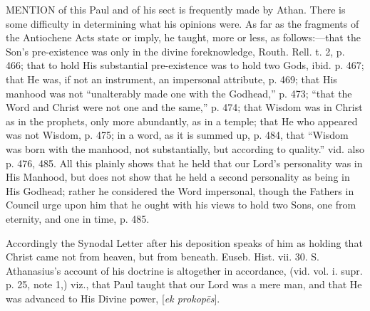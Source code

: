 MENTION
of this Paul and of his sect is frequently made by Athan. There is
some difficulty in determining what his opinions were. As far as the
fragments of the Antiochene Acts state or imply, he taught, more or
less, as follows:—that the Son's pre-existence was only in the
divine foreknowledge, Routh. Rell. t. 2, p. 466; that to hold His
substantial pre-existence was to hold two Gods, ibid. p. 467; that He
was, if not an instrument, an impersonal attribute, p. 469; that His
manhood was not ``unalterably made one with the Godhead,'' p. 473; ``that
the Word and Christ were not one and the same,'' p. 474; that Wisdom
was in Christ as in the prophets, only more abundantly, as in a
temple; that He who appeared was not Wisdom, p. 475; in a word, as it
is summed up, p. 484, that ``Wisdom was born with the manhood, not
substantially, but according to quality.'' vid. also p. 476, 485. All
this plainly shows that he held that our Lord's personality was in His
Manhood, but does not show that he held a second personality as being
in His Godhead; rather he considered the Word impersonal, though the
Fathers in Council urge upon him that he ought with his views to hold
two Sons, one from eternity, and one in time, p. 485.

Accordingly
the Synodal Letter after his deposition speaks of him as holding
that Christ came not from heaven, but from beneath. Euseb. Hist. vii.
30. S. Athanasius's account of his doctrine is altogether in
accordance, (vid. vol. i. supr. p. 25, note 1,) viz., that Paul taught
that our Lord was a mere man, and that He was advanced to His Divine
power, [\emph{ek prokop\={e}s}].

